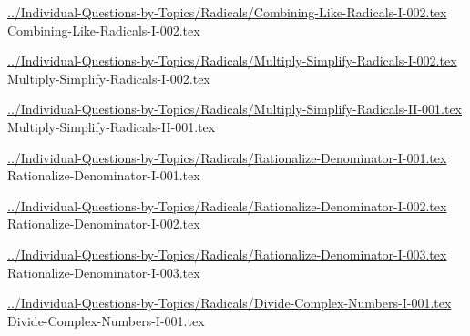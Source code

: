 \documentclass[answer,cancelspace,12pt]{exam}
\begin{document}
\begin{questions}
\question
\href{../Individual-Questions-by-Topics/Radicals/Combining-Like-Radicals-I-002.tex}{../Individual-Questions-by-Topics/Radicals/Combining-Like-Radicals-I-002.tex}
{Combining-Like-Radicals-I-002.tex}


\question
\href{../Individual-Questions-by-Topics/Radicals/Multiply-Simplify-Radicals-I-002.tex}{../Individual-Questions-by-Topics/Radicals/Multiply-Simplify-Radicals-I-002.tex}
{Multiply-Simplify-Radicals-I-002.tex}

\question
\href{../Individual-Questions-by-Topics/Radicals/Multiply-Simplify-Radicals-II-001.tex}{../Individual-Questions-by-Topics/Radicals/Multiply-Simplify-Radicals-II-001.tex}
{Multiply-Simplify-Radicals-II-001.tex}



\question
\href{../Individual-Questions-by-Topics/Radicals/Rationalize-Denominator-I-001.tex}{../Individual-Questions-by-Topics/Radicals/Rationalize-Denominator-I-001.tex}
{Rationalize-Denominator-I-001.tex}

\question
\href{../Individual-Questions-by-Topics/Radicals/Rationalize-Denominator-I-002.tex}{../Individual-Questions-by-Topics/Radicals/Rationalize-Denominator-I-002.tex}
{Rationalize-Denominator-I-002.tex}

\question
\href{../Individual-Questions-by-Topics/Radicals/Rationalize-Denominator-I-003.tex}{../Individual-Questions-by-Topics/Radicals/Rationalize-Denominator-I-003.tex}
{Rationalize-Denominator-I-003.tex}

\question
\href{../Individual-Questions-by-Topics/Radicals/Divide-Complex-Numbers-I-001.tex}{../Individual-Questions-by-Topics/Radicals/Divide-Complex-Numbers-I-001.tex}
{Divide-Complex-Numbers-I-001.tex}


\end{questions}
\end{document}
